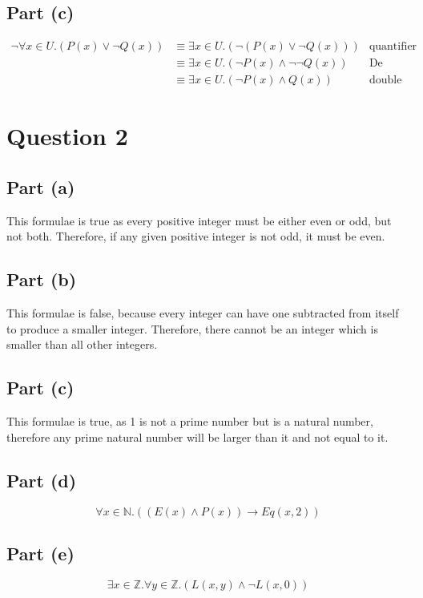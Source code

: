 \documentclass[11pt, a4paper]{article}
\begin{document}
\subsection*{Part (c)}
\begin{align*}
	\neg \forall x \in U.(P(x) \lor \neg Q(x)) &\equiv \exists x \in U.(\neg (P(x) \lor \neg Q(x)))     & \text{quantifier law} \\
	                                           &\equiv \exists x \in U.(\neg P(x) \land \neg \neg Q(x)) & \text{De Morgan's law} \\
						   &\equiv \exists x \in U.(\neg P(x) \land Q(x))           & \text{double negation law}
\end{align*}

\section*{Question 2}
\subsection*{Part (a)}
This formulae is true as every positive integer must be either even or odd, but not both.
Therefore, if any given positive integer is not odd, it must be even.

\subsection*{Part (b)}
This formulae is false, because every integer can have one subtracted from itself to produce a smaller integer.
Therefore, there cannot be an integer which is smaller than all other integers.

\subsection*{Part (c)}
This formulae is true, as 1 is not a prime number but is a natural number, therefore any prime natural number will be larger than it and not equal to it.

\subsection*{Part (d)}
\[ \forall x \in \mathbb{N}.((E(x) \land P(x)) \to Eq(x,2)) \]

\subsection*{Part (e)}
\[ \exists x \in \mathbb{Z}. \forall y \in \mathbb{Z}.(L(x,y) \land \neg L(x, 0)) \]
\end{document}

